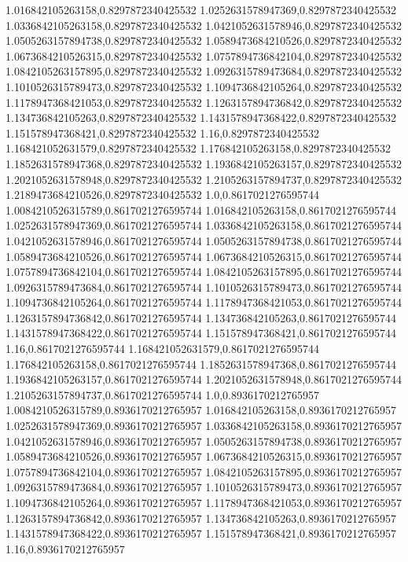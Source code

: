 1.016842105263158,0.8297872340425532
1.0252631578947369,0.8297872340425532
1.0336842105263158,0.8297872340425532
1.0421052631578946,0.8297872340425532
1.0505263157894738,0.8297872340425532
1.0589473684210526,0.8297872340425532
1.0673684210526315,0.8297872340425532
1.0757894736842104,0.8297872340425532
1.0842105263157895,0.8297872340425532
1.0926315789473684,0.8297872340425532
1.1010526315789473,0.8297872340425532
1.1094736842105264,0.8297872340425532
1.1178947368421053,0.8297872340425532
1.1263157894736842,0.8297872340425532
1.134736842105263,0.8297872340425532
1.1431578947368422,0.8297872340425532
1.151578947368421,0.8297872340425532
1.16,0.8297872340425532
1.168421052631579,0.8297872340425532
1.176842105263158,0.8297872340425532
1.1852631578947368,0.8297872340425532
1.1936842105263157,0.8297872340425532
1.2021052631578948,0.8297872340425532
1.2105263157894737,0.8297872340425532
1.2189473684210526,0.8297872340425532
1.0,0.8617021276595744
1.0084210526315789,0.8617021276595744
1.016842105263158,0.8617021276595744
1.0252631578947369,0.8617021276595744
1.0336842105263158,0.8617021276595744
1.0421052631578946,0.8617021276595744
1.0505263157894738,0.8617021276595744
1.0589473684210526,0.8617021276595744
1.0673684210526315,0.8617021276595744
1.0757894736842104,0.8617021276595744
1.0842105263157895,0.8617021276595744
1.0926315789473684,0.8617021276595744
1.1010526315789473,0.8617021276595744
1.1094736842105264,0.8617021276595744
1.1178947368421053,0.8617021276595744
1.1263157894736842,0.8617021276595744
1.134736842105263,0.8617021276595744
1.1431578947368422,0.8617021276595744
1.151578947368421,0.8617021276595744
1.16,0.8617021276595744
1.168421052631579,0.8617021276595744
1.176842105263158,0.8617021276595744
1.1852631578947368,0.8617021276595744
1.1936842105263157,0.8617021276595744
1.2021052631578948,0.8617021276595744
1.2105263157894737,0.8617021276595744
1.0,0.8936170212765957
1.0084210526315789,0.8936170212765957
1.016842105263158,0.8936170212765957
1.0252631578947369,0.8936170212765957
1.0336842105263158,0.8936170212765957
1.0421052631578946,0.8936170212765957
1.0505263157894738,0.8936170212765957
1.0589473684210526,0.8936170212765957
1.0673684210526315,0.8936170212765957
1.0757894736842104,0.8936170212765957
1.0842105263157895,0.8936170212765957
1.0926315789473684,0.8936170212765957
1.1010526315789473,0.8936170212765957
1.1094736842105264,0.8936170212765957
1.1178947368421053,0.8936170212765957
1.1263157894736842,0.8936170212765957
1.134736842105263,0.8936170212765957
1.1431578947368422,0.8936170212765957
1.151578947368421,0.8936170212765957
1.16,0.8936170212765957
